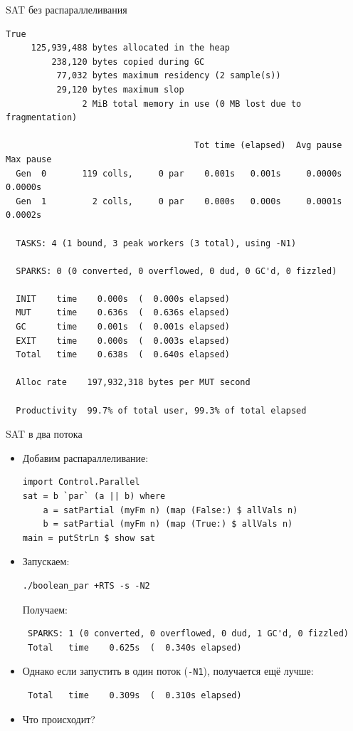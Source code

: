 \documentclass[xcolor=dvipsnames]{beamer}
\begin{document}
\begin{frame}[fragile]{SAT без распараллеливания}

\tiny
\begin{verbatim}
True
     125,939,488 bytes allocated in the heap
         238,120 bytes copied during GC
          77,032 bytes maximum residency (2 sample(s))
          29,120 bytes maximum slop
               2 MiB total memory in use (0 MB lost due to fragmentation)

                                     Tot time (elapsed)  Avg pause  Max pause
  Gen  0       119 colls,     0 par    0.001s   0.001s     0.0000s    0.0000s
  Gen  1         2 colls,     0 par    0.000s   0.000s     0.0001s    0.0002s

  TASKS: 4 (1 bound, 3 peak workers (3 total), using -N1)

  SPARKS: 0 (0 converted, 0 overflowed, 0 dud, 0 GC'd, 0 fizzled)

  INIT    time    0.000s  (  0.000s elapsed)
  MUT     time    0.636s  (  0.636s elapsed)
  GC      time    0.001s  (  0.001s elapsed)
  EXIT    time    0.000s  (  0.003s elapsed)
  Total   time    0.638s  (  0.640s elapsed)

  Alloc rate    197,932,318 bytes per MUT second

  Productivity  99.7% of total user, 99.3% of total elapsed
\end{verbatim}

 
\end{frame}

\begin{frame}[fragile]{SAT в два потока}
 
 \begin{itemize}[<+->]
  \item Добавим распараллеливание:
{\footnotesize
\begin{verbatim}
import Control.Parallel
sat = b `par` (a || b) where
    a = satPartial (myFm n) (map (False:) $ allVals n)
    b = satPartial (myFm n) (map (True:) $ allVals n)
main = putStrLn $ show sat
\end{verbatim}

}
\item Запускаем:
{\footnotesize
\begin{verbatim}
./boolean_par +RTS -s -N2
\end{verbatim}

}
Получаем:
{\scriptsize
\begin{verbatim}
 SPARKS: 1 (0 converted, 0 overflowed, 0 dud, 1 GC'd, 0 fizzled)
 Total   time    0.625s  (  0.340s elapsed)
\end{verbatim}
}
\item Однако если запустить в один поток ({\tt -N1}), получается ещё лучше:
{\scriptsize
\begin{verbatim}
 Total   time    0.309s  (  0.310s elapsed)
\end{verbatim}
}
\item Что происходит?
 \end{itemize}


\end{frame}
\end{document}
